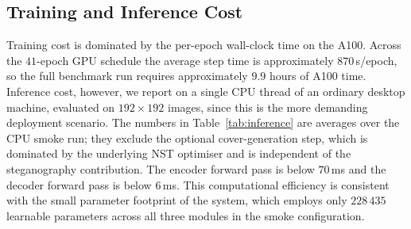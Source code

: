 \documentclass[conference]{IEEEtran}
\begin{document}
\subsection{Training and Inference Cost}
\label{sec:inference}
Training cost is dominated by the per-epoch wall-clock time on the A100. Across the $41$-epoch GPU schedule the average step time is approximately $870$\,s/epoch, so the full benchmark run requires approximately $9.9$ hours of A100 time. Inference cost, however, we report on a single CPU thread of an ordinary desktop machine, evaluated on $192\!\times\!192$ images, since this is the more demanding deployment scenario. The numbers in Table~\ref{tab:inference} are averages over the CPU smoke run; they exclude the optional cover-generation step, which is dominated by the underlying NST optimiser and is independent of the steganography contribution. The encoder forward pass is below $70$\,ms and the decoder forward pass is below $6$\,ms. This computational efficiency is consistent with the small parameter footprint of the system, which employs only $228\,435$ learnable parameters across all three modules in the smoke configuration.

\begin{table}[t]
\centering
\caption{Training and inference budget. The GPU row is measured on our benchmark run on a Colab A100; the CPU rows come from the CPU smoke run on a desktop single-thread baseline at $192\!\times\!192$.}
\label{tab:inference}
\setlength{\tabcolsep}{3pt}
\footnotesize
{}
\end{table}
\end{document}
